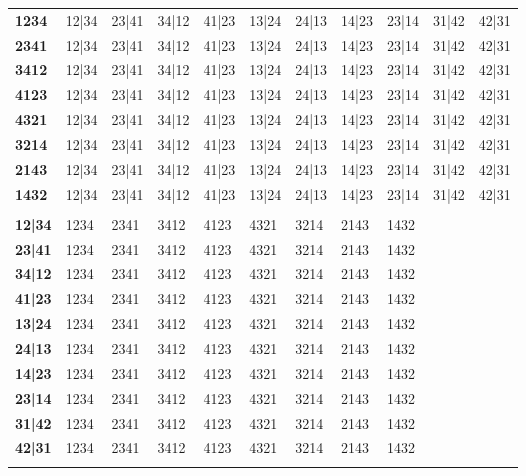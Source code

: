 \documentclass[letterpaper]{article}
\begin{document}
\begin{minipage}[t]{0.50\linewidth}
\begin{tabular}{@{}lllllllllll@{}}
\rowcolor{altrow}
\textbf{1234} & 12|34 & 23|41 & 34|12 & 41|23 & 13|24 & 24|13 & 14|23 & 23|14 & 31|42 & 42|31 \\
\textbf{2341} & 12|34 & 23|41 & 34|12 & 41|23 & 13|24 & 24|13 & 14|23 & 23|14 & 31|42 & 42|31 \\
\rowcolor{altrow}
\textbf{3412} & 12|34 & 23|41 & 34|12 & 41|23 & 13|24 & 24|13 & 14|23 & 23|14 & 31|42 & 42|31 \\
\textbf{4123} & 12|34 & 23|41 & 34|12 & 41|23 & 13|24 & 24|13 & 14|23 & 23|14 & 31|42 & 42|31 \\
\rowcolor{altrow}
\textbf{4321} & 12|34 & 23|41 & 34|12 & 41|23 & 13|24 & 24|13 & 14|23 & 23|14 & 31|42 & 42|31 \\
\textbf{3214} & 12|34 & 23|41 & 34|12 & 41|23 & 13|24 & 24|13 & 14|23 & 23|14 & 31|42 & 42|31 \\
\rowcolor{altrow}
\textbf{2143} & 12|34 & 23|41 & 34|12 & 41|23 & 13|24 & 24|13 & 14|23 & 23|14 & 31|42 & 42|31 \\
\textbf{1432} & 12|34 & 23|41 & 34|12 & 41|23 & 13|24 & 24|13 & 14|23 & 23|14 & 31|42 & 42|31 \\
\rowcolor{headerbg}\multicolumn{11}{l}{\color{white}\textbf{4-fng pair / 4-fng seq}}\\
\rowcolor{altrow}
\textbf{12|34} & 1234 & 2341 & 3412 & 4123 & 4321 & 3214 & 2143 & 1432 &  &  \\
\textbf{23|41} & 1234 & 2341 & 3412 & 4123 & 4321 & 3214 & 2143 & 1432 &  &  \\
\rowcolor{altrow}
\textbf{34|12} & 1234 & 2341 & 3412 & 4123 & 4321 & 3214 & 2143 & 1432 &  &  \\
\textbf{41|23} & 1234 & 2341 & 3412 & 4123 & 4321 & 3214 & 2143 & 1432 &  &  \\
\rowcolor{altrow}
\textbf{13|24} & 1234 & 2341 & 3412 & 4123 & 4321 & 3214 & 2143 & 1432 &  &  \\
\textbf{24|13} & 1234 & 2341 & 3412 & 4123 & 4321 & 3214 & 2143 & 1432 &  &  \\
\rowcolor{altrow}
\textbf{14|23} & 1234 & 2341 & 3412 & 4123 & 4321 & 3214 & 2143 & 1432 &  &  \\
\textbf{23|14} & 1234 & 2341 & 3412 & 4123 & 4321 & 3214 & 2143 & 1432 &  &  \\
\rowcolor{altrow}
\textbf{31|42} & 1234 & 2341 & 3412 & 4123 & 4321 & 3214 & 2143 & 1432 &  &  \\
\textbf{42|31} & 1234 & 2341 & 3412 & 4123 & 4321 & 3214 & 2143 & 1432 &  &  \\
\rowcolor{headerbg}\multicolumn{11}{l}{\color{white}\textbf{3-fng seq / 3-fng pair}}\\

\end{tabular}
\end{minipage}
\end{document}
